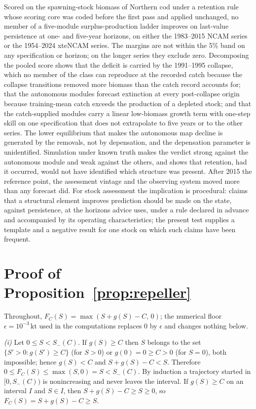 \documentclass[preprint,11pt,authoryear]{elsarticle}
\theoremstyle{definition}
\theoremstyle{remark}
\newcommand{\kt}{\,\mathrm{kt}}
\begin{document}
Scored on the spawning-stock biomass of Northern cod under a retention rule whose scoring core was coded before the first pass and applied unchanged, no member of a five-module surplus-production ladder improves on last-value persistence at one- and five-year horizons, on either the 1983--2015 NCAM series or the 1954--2024 xteNCAM series. The margins are not within the 5\% band on any specification or horizon; on the longer series they exclude zero. Decomposing the pooled score shows that the deficit is carried by the 1991--1995 collapse, which no member of the class can reproduce at the recorded catch because the collapse transitions removed more biomass than the catch record accounts for; that the autonomous modules forecast extinction at every post-collapse origin because training-mean catch exceeds the production of a depleted stock; and that the catch-supplied modules carry a linear low-biomass growth term with one-step skill on one specification that does not extrapolate to five years or to the other series. The lower equilibrium that makes the autonomous map decline is generated by the removals, not by depensation, and the depensation parameter is unidentified. Simulation under known truth makes the verdict strong against the autonomous module and weak against the others, and shows that retention, had it occurred, would not have identified which structure was present. After 2015 the reference point, the assessment vintage and the observing system moved more than any forecast did. For stock assessment the implication is procedural: claims that a structural element improves prediction should be made on the state, against persistence, at the horizons advice uses, under a rule declared in advance and accompanied by its operating characteristics; the present test supplies a template and a negative result for one stock on which such claims have been frequent.
\appendix
\section{Proof of Proposition~\ref{prop:repeller}}\label{app:proof}

Throughout, $F_C(S) = \max(S + g(S) - C,\,0)$; the numerical floor $\epsilon = 10^{-3}\kt$ used in the computations replaces $0$ by $\epsilon$ and changes nothing below.

\emph{(i)} Let $0 \le S < S_-(C)$. If $g(S) \ge C$ then $S$ belongs to the set $\{S'>0 : g(S')\ge C\}$ (for $S>0$) or $g(0)=0\ge C>0$ (for $S=0$), both impossible; hence $g(S) < C$ and $S + g(S) - C < S$. Therefore $0 \le F_C(S) \le \max(S,0) = S < S_-(C)$. By induction a trajectory started in $[0,S_-(C))$ is nonincreasing and never leaves the interval. If $g(S) \ge C$ on an interval $I$ and $S\in I$, then $S + g(S) - C \ge S \ge 0$, so $F_C(S) = S + g(S) - C \ge S$.
\end{document}
